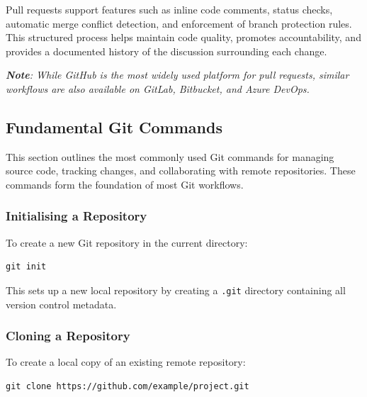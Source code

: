 \documentclass{article}
\newcommand{\codecmd}[1]{\textcolor[rgb]{0,0.5,0}{\texttt{#1}}}
\begin{document}
Pull requests support features such as inline code comments, status checks, automatic merge conflict detection, and enforcement of branch protection rules. This structured process helps maintain code quality, promotes accountability, and provides a documented history of the discussion surrounding each change.

\medskip
\textit{\textbf{Note}: While GitHub is the most widely used platform for pull requests, similar workflows are also available on GitLab, Bitbucket, and Azure DevOps.}



\subsection{Fundamental Git Commands}

This section outlines the most commonly used Git commands for managing source code, tracking changes, and collaborating with remote repositories. These commands form the foundation of most Git workflows.

\subsubsection{Initialising a Repository}

To create a new Git repository in the current directory:

\begin{tcolorbox}[colback=mintgreen, colframe=green!40!black, boxrule=0.5pt, sharp corners]
\begin{verbatim}
git init
\end{verbatim}
\end{tcolorbox}

\noindent This sets up a new local repository by creating a \codecmd{.git} directory containing all version control metadata.

\subsubsection{Cloning a Repository}

To create a local copy of an existing remote repository:

\begin{tcolorbox}[colback=mintgreen, colframe=green!40!black, boxrule=0.5pt, sharp corners]
\begin{verbatim}
git clone https://github.com/example/project.git
\end{verbatim}
\end{tcolorbox}
\end{document}
